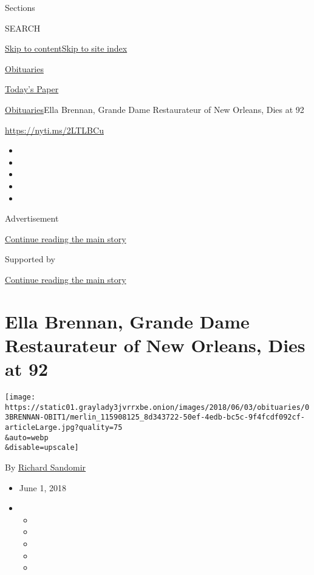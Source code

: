 Sections

SEARCH

\protect\hyperlink{site-content}{Skip to
content}\protect\hyperlink{site-index}{Skip to site index}

\href{https://www.nytimes3xbfgragh.onion/section/obituaries}{Obituaries}

\href{https://myaccount.nytimes3xbfgragh.onion/auth/login?response_type=cookie\&client_id=vi}{}

\href{https://www.nytimes3xbfgragh.onion/section/todayspaper}{Today's
Paper}

\href{/section/obituaries}{Obituaries}\textbar{}Ella Brennan, Grande
Dame Restaurateur of New Orleans, Dies at 92

\url{https://nyti.ms/2LTLBCu}

\begin{itemize}
\item
\item
\item
\item
\item
\end{itemize}

Advertisement

\protect\hyperlink{after-top}{Continue reading the main story}

Supported by

\protect\hyperlink{after-sponsor}{Continue reading the main story}

\hypertarget{ella-brennan-grande-dame-restaurateur-of-new-orleans-dies-at-92}{%
\section{Ella Brennan, Grande Dame Restaurateur of New Orleans, Dies at
92}\label{ella-brennan-grande-dame-restaurateur-of-new-orleans-dies-at-92}}

\texttt{[image: https://static01.graylady3jvrrxbe.onion/images/2018/06/03/obituaries/03BRENNAN-OBIT1/merlin\_115908125\_8d343722-50ef-4edb-bc5c-9f4fcdf092cf-articleLarge.jpg?quality=75\\\&auto=webp\\\&disable=upscale]}

By \href{https://www.nytimes3xbfgragh.onion/by/richard-sandomir}{Richard
Sandomir}

\begin{itemize}
\item
  June 1, 2018
\item
  \begin{itemize}
  \item
  \item
  \item
  \item
  \item
  \end{itemize}
\end{itemize}

